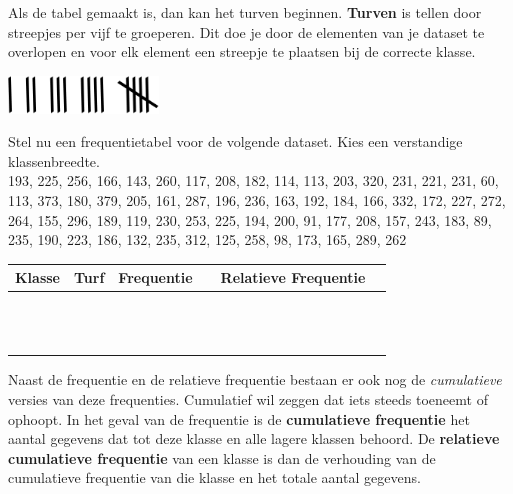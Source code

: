 \documentclass[12pt,twoside]{article}
\begin{document}
Als de tabel gemaakt is, dan kan het turven beginnen. {\bf Turven} is tellen door streepjes per vijf te groeperen. Dit doe je door de elementen van je dataset te overlopen en voor elk element een streepje te plaatsen bij de correcte klasse.

\begin{center}
\includegraphics[width=0.3\textwidth]{turven}
\end{center}

\begin{oefening}
Stel nu een frequentietabel voor de volgende dataset. Kies een verstandige klassenbreedte.\\
193, 225, 256, 166, 143, 260, 117, 208, 182, 114, 113, 203, 320, 231, 221, 231, 60, 113, 373, 180, 379, 205, 161, 287, 196, 236, 163, 192, 184, 166, 332, 172, 227, 272, 264, 155, 296, 189, 119, 230, 253, 225, 194, 200, 91, 177, 208, 157, 243, 183, 89, 235, 190, 223, 186, 132, 235, 312, 125, 258, 98, 173, 165, 289, 262
\\
\begin{center}
  \setlength{\tabcolsep}{5pt}
  \renewcommand{\arraystretch}{1}
  \begin{tabular}{|p{2cm}|p{2cm}|p{2cm}|p{2cm}|p{2cm}|p{2cm}|}
    \hline
    Klasse & Turf & Frequentie &&Relatieve Frequentie&\\
    \hline&&&&&\\\hline&&&&&\\\hline&&&&&\\\hline&&&&&\\\hline&&&&&\\
    \hline&&&&&\\\hline&&&&&\\\hline&&&&&\\\hline&&&&&\\\hline&&&&&\\
    \hline&&&&&\\\hline&&&&&\\\hline
  \end{tabular}
\end{center}
\end{oefening}

Naast de frequentie en de relatieve frequentie bestaan er ook nog de {\it cumulatieve} versies van deze frequenties. Cumulatief wil zeggen dat iets steeds toeneemt of ophoopt. In het geval van de frequentie is de {\bf cumulatieve frequentie} het aantal gegevens dat tot deze klasse en alle lagere klassen behoord. De {\bf relatieve cumulatieve frequentie} van een klasse is dan de verhouding van de cumulatieve frequentie van die klasse en het totale aantal gegevens.
\end{document}
